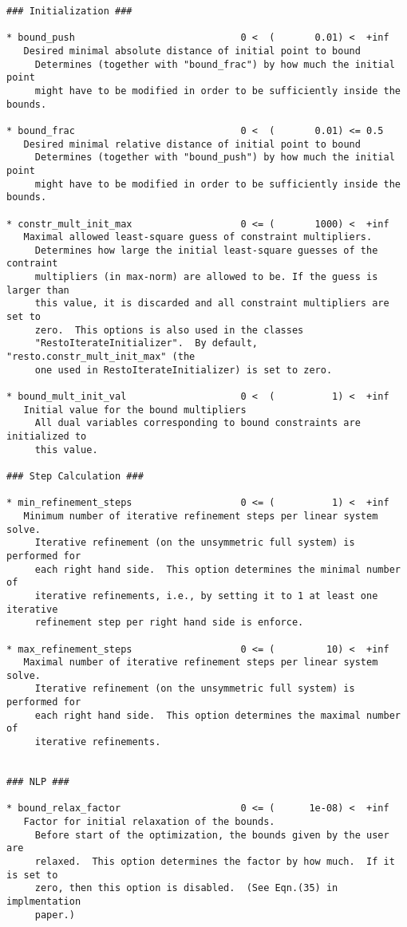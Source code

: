 \documentclass[letter,10pt]{article}
\begin{document}
{\begin{verbatim}
### Initialization ###

* bound_push                             0 <  (       0.01) <  +inf      
   Desired minimal absolute distance of initial point to bound
     Determines (together with "bound_frac") by how much the initial point
     might have to be modified in order to be sufficiently inside the bounds.

* bound_frac                             0 <  (       0.01) <= 0.5       
   Desired minimal relative distance of initial point to bound
     Determines (together with "bound_push") by how much the initial point
     might have to be modified in order to be sufficiently inside the bounds.

* constr_mult_init_max                   0 <= (       1000) <  +inf      
   Maximal allowed least-square guess of constraint multipliers.
     Determines how large the initial least-square guesses of the contraint
     multipliers (in max-norm) are allowed to be. If the guess is larger than
     this value, it is discarded and all constraint multipliers are set to
     zero.  This options is also used in the classes
     "RestoIterateInitializer".  By default, "resto.constr_mult_init_max" (the
     one used in RestoIterateInitializer) is set to zero.

* bound_mult_init_val                    0 <  (          1) <  +inf      
   Initial value for the bound multipliers
     All dual variables corresponding to bound constraints are initialized to
     this value.

### Step Calculation ###

* min_refinement_steps                   0 <= (          1) <  +inf      
   Minimum number of iterative refinement steps per linear system solve.
     Iterative refinement (on the unsymmetric full system) is performed for
     each right hand side.  This option determines the minimal number of
     iterative refinements, i.e., by setting it to 1 at least one iterative
     refinement step per right hand side is enforce.

* max_refinement_steps                   0 <= (         10) <  +inf      
   Maximal number of iterative refinement steps per linear system solve.
     Iterative refinement (on the unsymmetric full system) is performed for
     each right hand side.  This option determines the maximal number of
     iterative refinements.


### NLP ###

* bound_relax_factor                     0 <= (      1e-08) <  +inf      
   Factor for initial relaxation of the bounds.
     Before start of the optimization, the bounds given by the user are
     relaxed.  This option determines the factor by how much.  If it is set to
     zero, then this option is disabled.  (See Eqn.(35) in implmentation
     paper.)



\end{verbatim}}
\end{document}
